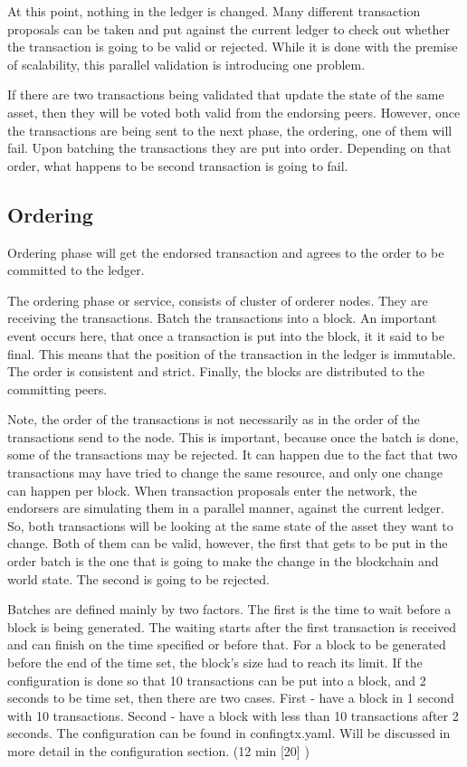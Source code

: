 \documentclass[a4paper,11pt]{report}
\begin{document}
	At this point, nothing in the ledger is changed. Many different transaction proposals can be taken and put against the current ledger to check out whether the transaction is going to be valid or rejected. While it is done with the premise of scalability, this parallel validation is introducing one problem. 
	
	If there are two transactions being validated that update the state of the same asset, then they will be voted both valid from the endorsing peers. However, once the transactions are being sent to the next phase, the ordering, one of them will fail. Upon batching the transactions they are put into order. Depending on that order, what happens to be second transaction is going to fail.

\subsection{Ordering}
Ordering phase will get the endorsed transaction and agrees to the order to be committed to the ledger.

The ordering phase or service, consists of cluster of orderer nodes. They are receiving the transactions. Batch the transactions into a block. An important event occurs here, that once a transaction is put into the block, it it said to be final. This means that the position of the transaction in the ledger is immutable. The order is consistent and strict. Finally, the blocks are distributed to the committing peers.
	
	Note, the order of the transactions is not necessarily as in the order of the transactions send to the node. This is important, because once the batch is done, some of the transactions may be rejected. It can happen due to the fact that two transactions may have tried to change the same resource, and only one change can happen per block. When transaction proposals enter the network, the endorsers are simulating them in a parallel manner, against the current ledger. So, both transactions will be looking at the same state of the asset they want to change. Both of them can be valid, however, the first that gets to be put in the order batch is the one that is going to make the change in the blockchain and world state. The second is going to be rejected.
	
Batches are defined mainly by two factors. The first is the time to wait before a block is being generated. The waiting starts after the first transaction is received and can finish on the time specified or before that. For a block to be generated before the end of the time set, the block’s size had to reach its limit. If the configuration is done so that 10 transactions can be put into a block, and 2 seconds to be time set, then there are two cases. First - have a block in 1 second with 10 transactions. Second - have a block with less than 10 transactions after 2 seconds. The configuration can be found in confingtx.yaml. Will be discussed in more detail in the configuration section. (12 min [20] )
\end{document}

